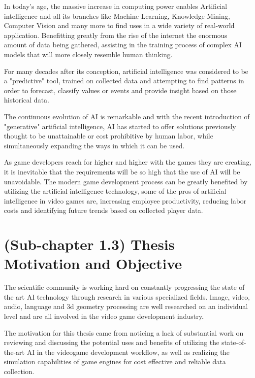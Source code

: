 \documentclass[a4paper,one side,12pt]{book}
\begin{document}
In today's age, the massive increase in computing power enables
Artificial intelligence and all its branches like Machine Learning,
Knowledge Mining, Computer Vision and many more to find uses in a wide
variety of real-world application. Benefitting greatly from the rise of
the internet the enormous amount of data being gathered, assisting in
the training process of complex AI models that will more closely
resemble human thinking.

For many decades after its conception, artificial intelligence was
considered to be a "predictive" tool, trained on collected data and
attempting to find patterns in order to forecast, classify values or
events and provide insight based on those historical data.

The continuous evolution of AI is remarkable and with the recent
introduction of "generative" artificial intelligence, AI has started
to offer solutions previously thought to be unattainable or cost
prohibitive by human labor, while simultaneously expanding the ways in
which it can be used.

As game developers reach for higher and higher with the games they are
creating, it is inevitable that the requirements will be so high that
the use of AI will be unavoidable. The modern game development process
can be greatly benefited by utilizing the artificial intelligence
technology, some of the pros of artificial intelligence in video games
are, increasing employee productivity, reducing labor costs and
identifying future trends based on collected player data.

\section{(Sub-chapter 1.3) Thesis Motivation and Objective}

The scientific community is working hard on constantly progressing the state of the art
AI technology through research in various specialized fields. Image, video, audio, language 
and 3d geometry processing are well researched on an individual level and are all 
involved in the video game development industry. 

The motivation for this thesis came from noticing a lack of substantial work on reviewing 
and discussing the potential uses and benefits of utilizing the state-of-the-art AI in 
the videogame development workflow, as well as realizing the simulation capabilities of game 
engines for cost effective and reliable data collection.\\
\end{document}
